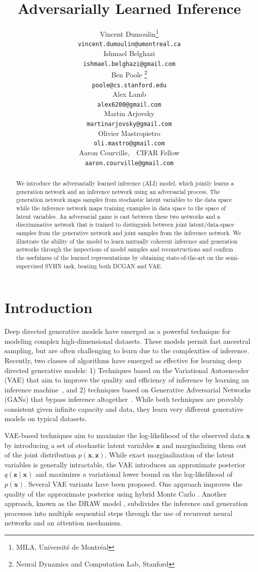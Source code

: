 \documentclass{article}
\title{Adversarially Learned Inference}
\author{
    Vincent Dumoulin\thanks{MILA, Université de Montréal} \\
    \texttt{vincent.dumoulin@umontreal.ca} \\
    \And
    Ishmael Belghazi\samethanks[1] \\
    \texttt{ishmael.belghazi@gmail.com} \\
    \And
    Ben Poole \thanks{Neural Dynamics and Computation Lab, Stanford} \\
    \texttt{poole@cs.stanford.edu} \\
    \And
    Alex Lamb\samethanks[1] \\
    \texttt{alex6200@gmail.com} \\
    \And
    Martin Arjovsky\samethanks[1] \\
    \texttt{martinarjovsky@gmail.com} \\
    \And
    Olivier Mastropietro\samethanks[1] \\
    \texttt{oli.mastro@gmail.com} \\
    \And
    Aaron Courville\samethanks[1]\textnormal{,\ \ CIFAR Fellow} \\
    \texttt{aaron.courville@gmail.com} \\
}
\begin{document}
\maketitle

\begin{abstract}
We introduce the adversarially learned inference (ALI) model, which jointly
learns a generation network and an inference network using an adversarial
process. The generation network maps samples from stochastic latent variables
to the data space while the inference network maps training examples in data
space to the space of latent variables. An adversarial game is cast between
these two networks and a discriminative network that is trained to distinguish
between joint latent/data-space samples from the generative network and joint
samples from the inference network.  We illustrate the ability of the model to learn mutually
coherent inference and generation networks through the inspections of model
samples and reconstructions and confirm the usefulness of the learned
representations by obtaining state-of-the-art on the semi-supervised SVHN
task, beating both DCGAN and VAE.
\end{abstract}

\section{Introduction}

Deep directed generative models have emerged as a powerful technique for
modeling complex high-dimensional datasets. These models permit fast ancestral
sampling, but are often challenging to learn due to the complexities of
inference. Recently, two classes of algorithms have emerged as effective for
learning deep directed generative models: 1) Techniques based on the
Variational Autoencoder (VAE) that aim to improve the quality and efficiency of
inference by learning an inference
machine~\citep{kingma2013auto,rezende2014stochastic}, and 2) techniques based
on Generative Adversarial Networks (GANs) that bypass inference
altogether~\citep{goodfellow2014generative}. While both techniques are provably
consistent given infinite capacity and data, they learn very different
generative models on typical datasets.

VAE-based techniques aim to maximize the log-likelihood of the observed data
$\bm{x}$ by introducing a set of stochastic latent variables $\bm{z}$ and
marginalizing them out of the joint distribution $p(\bm{x}, \bm{z})$. While
exact marginalization of the latent variables is generally intractable, the VAE
introduces an approximate posterior $q(\bm{z} \mid \bm{x})$ and maximizes a
variational lower bound on the log-likelihood of $p(\bm{x})$. Several VAE
variants have been proposed. One approach improves the quality of the
approximate posterior using hybrid Monte Carlo \citep{salimans2014markov}.
Another approach, known as the DRAW model \citep{gregor2015draw}, subdivides
the inference and generation processes into multiple sequential steps through
the use of recurrent neural networks and an attention mechanism.
\end{document}
